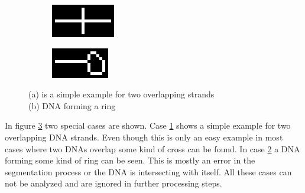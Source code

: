 \documentclass{article}
\begin{document}
\begin{figure}[H]
	\centering
	\begin{subfigure}[b]{0.35\textwidth}
		\includegraphics[width=\linewidth]{praes2}
		\caption{}
		\label{fig: crossed}
	\end{subfigure}
	\hspace{20mm}
	\begin{subfigure}[b]{0.35\textwidth}
		\includegraphics[width=\linewidth]{rect4833}
		\caption{}
		\label{fig: ring}
	\end{subfigure}
	\captionsetup{justification=centering}
	\caption{(a) is a simple example for two overlapping strands\\ (b) DNA forming a ring}
	\label{fig: crossring} %
\end{figure}
In figure \ref{fig: crossring} two special cases are shown. Case \ref{fig: crossed} shows a simple example for two overlapping DNA strands. Even though this is only an easy example in most cases where two DNAs overlap some kind of cross can be found. In case \ref{fig: ring} a DNA forming some kind of ring can be seen. This is mostly an error in the segmentation process or the DNA is intersecting with itself. All these cases can not be analyzed and are ignored in further processing steps. \\
\end{document}
